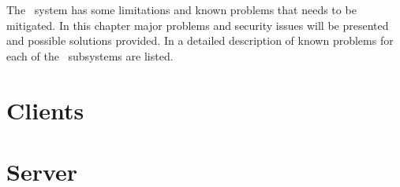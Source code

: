 The \appName\ system has some limitations and known problems that needs to be
mitigated. In this chapter major problems and security issues will be presented
and possible solutions provided. In  a detailed
description of known problems for each of the \appName\ subsystems are listed.

\section{Clients}

\FloatBarrier
\section{Server}


